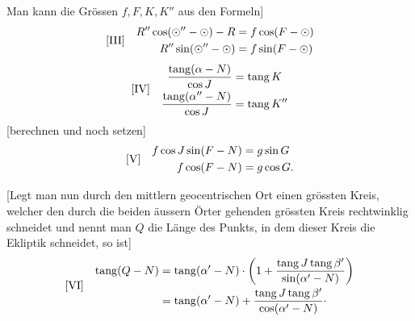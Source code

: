 Man kann die Grössen \(f,F,K,K''\) aus den Formeln]
\[
\begin{array}{l@{\quad}l}
[\mathrm{III}]&\begin{aligned}
R''\cos(\odot''-\odot)-R&=f\cos(F-\odot)\\
R''\sin(\odot''-\odot)&=f\sin(F-\odot)
\end{aligned}
\end{array}
\]
\[
\begin{array}{l@{\quad}l}
[\mathrm{IV}]&\begin{aligned}
\frac{\operatorname{tang}(\alpha-N)}{\cos J}&=\operatorname{tang}K\\
\frac{\operatorname{tang}(\alpha''-N)}{\cos J}&=\operatorname{tang}K''
\end{aligned}
\end{array}
\]
[berechnen und noch setzen]
\[
\begin{array}{l@{\quad}l}
[\mathrm{V}]&\begin{aligned}
f\cos J\sin(F-N)&=g\sin G\\
f\cos(F-N)&=g\cos G.
\end{aligned}
\end{array}
\]

[Legt man nun durch den mittlern geocentrischen Ort einen grössten Kreis, welcher den durch die beiden äussern Örter gehenden grössten Kreis rechtwinklig schneidet und nennt man \(Q\) die Länge des Punkts, in dem dieser Kreis die Ekliptik schneidet, so ist]
\[
\begin{array}{l@{\quad}l}
[\mathrm{VI}]&\begin{aligned}
\operatorname{tang}(Q-N)&=\operatorname{tang}(\alpha'-N)\cdot\left(1+\frac{\operatorname{tang}J\operatorname{tang}\beta'}{\sin(\alpha'-N)}\right)\\
&=\operatorname{tang}(\alpha'-N)+\frac{\operatorname{tang}J\operatorname{tang}\beta'}{\cos(\alpha'-N)}\mathpunct{\cdot}
\end{aligned}
\end{array}
\]


